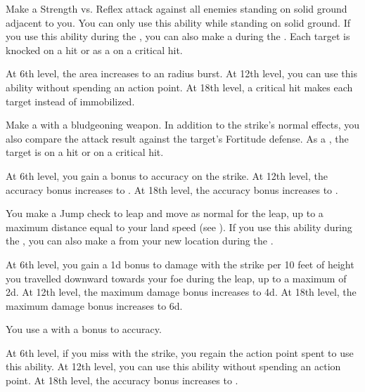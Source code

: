 {             Make a Strength vs. Reflex attack against all enemies standing on solid ground adjacent to you.
            You can only use this ability while standing on solid ground.
            If you use this ability during the , you can also make a  during the .
            Each target is knocked \prone on a hit or \immobilized as a  on a critical hit.
            \par At 6th level, the area increases to an \areamed radius burst.
            At 12th level, you can use this ability without spending an action point.
            At 18th level, a critical hit makes each target \stunned instead of immobilized.

             Make a  with a bludgeoning weapon.
            In addition to the strike's normal effects, you also compare the attack result against the target's Fortitude defense.
            As a , the target is \sickened on a hit or \nauseated on a critical hit.
            \par At 6th level, you gain a  bonus to accuracy on the strike.
            At 12th level, the accuracy bonus increases to .
            At 18th level, the accuracy bonus increases to .

             You make a Jump check to leap and move as normal for the leap, up to a maximum distance equal to your land speed (see ).
            If you use this ability during the , you can also make a  from your new location during the .
            \par At 6th level, you gain a \plus1d bonus to damage with the strike per 10 feet of height you travelled downward towards your foe during the leap, up to a maximum of \plus2d.
            At 12th level, the maximum damage bonus increases to \plus4d.
            At 18th level, the maximum damage bonus increases to \plus6d.

             You use a  with a  bonus to accuracy.
            \par At 6th level, if you miss with the strike, you regain the action point spent to use this ability.
            At 12th level, you can use this ability without spending an action point.
            At 18th level, the accuracy bonus increases to .

}
